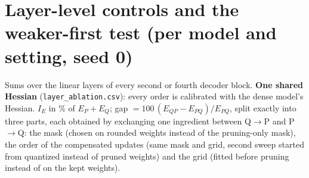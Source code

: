\documentclass{article}
\begin{document}
\clearpage
\clearpage\section*{Layer-level controls and the weaker-first test (per model and setting, seed 0)}
Sums over the linear layers of every second or fourth decoder block. \textbf{One shared Hessian} (\texttt{layer\_ablation.csv}): every order is calibrated with the dense model's Hessian. $I_E$ in \% of $E_P+E_Q$; gap $=100\,(E_{QP}-E_{PQ})/E_{PQ}$, split exactly into three parts, each obtained by exchanging one ingredient between Q$\to$P and P$\to$Q: the mask (chosen on rounded weights instead of the pruning-only mask), the order of the compensated updates (same mask and grid, second sweep started from quantized instead of pruned weights) and the grid (fitted before pruning instead of on the kept weights).
\end{document}
